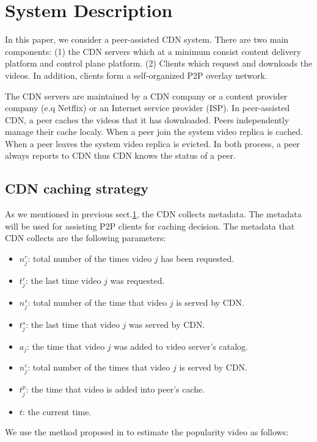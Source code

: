 \documentclass[10pt,final,journal,a4paper]{IEEEtran}
\begin{document}
\section{System Description}\label{systemdescription}
In this paper, we consider a peer-assisted CDN system. 
There are two main components: (1) the CDN servers which at a minimum consist content delivery platform and control plane platform. 
(2) Clients which request and downloads the videos.
In addition, clients form a self-organized P2P overlay network.

The CDN servers are maintained by a CDN company or a content provider company (e.q Netflix) or an Internet service provider (ISP).
In peer-assisted CDN, a peer caches the videos that it has downloaded.
Peers independently manage their cache localy.
When a peer join the system video replica is cached.
When a peer leaves the system video replica is evicted. 
In both process, a peer always reports to CDN thus CDN knows the status of a peer.



\subsection{CDN caching strategy}\label{cdncachingstrategy}
As we mentioned in previous sect.\ref{systemdescription}, the CDN collects metadata.
The metadata will be used for assisting P2P clients for caching decision. 
The metadata that CDN collects are the following parameters:
\begin{itemize}
\item $n_j^r$: total number of the times video $j$ has been requested.  
\item $t_j^r$: the last time video $j$ was requested.
\item $n_j^s$: total number of the time that video $j$ is served by CDN.
\item $t_j^s$: the last time that video $j$ was served by CDN.
\item $a_j$: the time that video $j$ was added to video server's catalog.
\item $n_j^c$: total number of the times that video $j$ is served by CDN.
\item $t_j^p$: the time that video  is added into peer's cache.
\item $t$: the current time.
\end{itemize}

We use the method proposed in \cite{1613869} to estimate the popularity video as follows:
\end{document}
